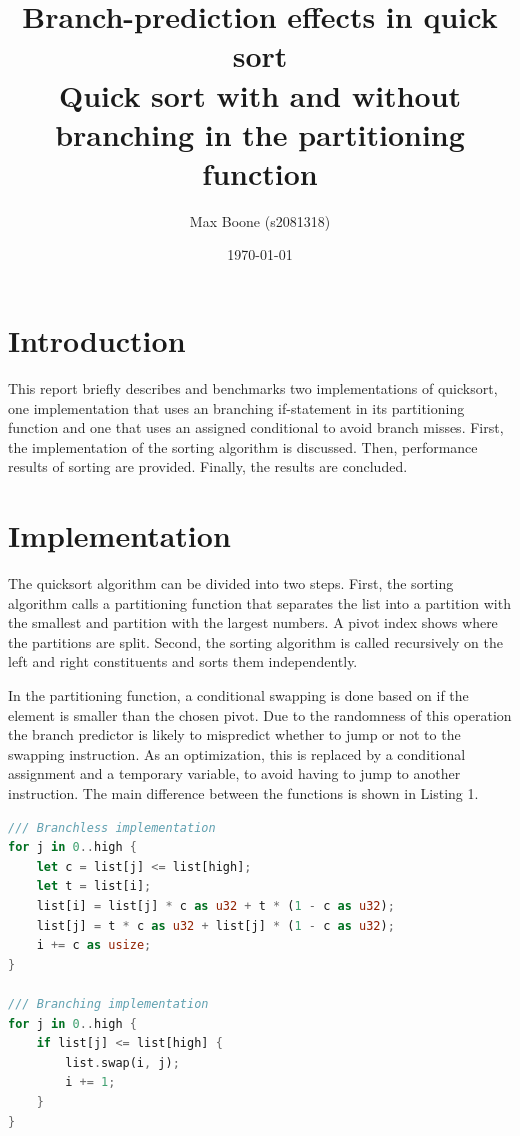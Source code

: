 \documentclass[a4paper,10pt]{article}
\title{
  Branch-prediction effects in quick sort \\
\small Quick sort with and without branching in the partitioning function}
\author{Max Boone (s2081318)}
\date{\today}
\begin{document}
\maketitle

\section{Introduction}

This report briefly describes and benchmarks two implementations of
quicksort, one implementation that uses an branching if-statement in
its partitioning function and one that uses an assigned conditional
to avoid branch misses. First, the implementation of the sorting
algorithm is discussed. Then, performance results of sorting are
provided. Finally, the results are concluded.

\section{Implementation}

The quicksort algorithm can be divided into two steps. First, the sorting
algorithm calls a partitioning function that separates the list into a partition
with the smallest and partition with the largest numbers. A pivot index shows
where the partitions are split. Second, the sorting algorithm is called recursively
on the left and right constituents and sorts them independently.

In the partitioning function, a conditional swapping is done based on
if the element is smaller than the chosen pivot. Due to the randomness
of this operation the branch predictor is likely to mispredict whether
to jump or not to the swapping instruction. As an optimization, this is
replaced by a conditional assignment and a temporary variable, to avoid
having to jump to another instruction. The main difference between the
functions is shown in Listing 1.

\begin{lstlisting}[language=rust, caption={Both partitioning implementations in Rust}, captionpos=b]
/// Branchless implementation
for j in 0..high {
    let c = list[j] <= list[high];
    let t = list[i];
    list[i] = list[j] * c as u32 + t * (1 - c as u32);
    list[j] = t * c as u32 + list[j] * (1 - c as u32);
    i += c as usize;
}

/// Branching implementation
for j in 0..high {
    if list[j] <= list[high] {
        list.swap(i, j);
        i += 1;
    }
}
\end{lstlisting}
\end{document}
